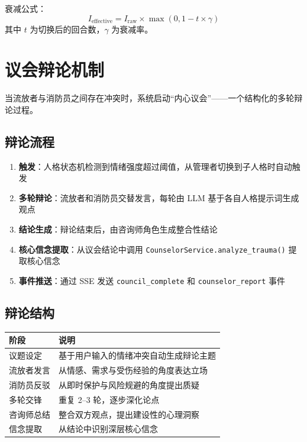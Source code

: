 \documentclass[12pt,a4paper]{ctexart}
\begin{document}
衰减公式：
\[
I_{\text{effective}} = I_{\text{raw}} \times \max(0, 1 - t \times \gamma)
\]
其中 $t$ 为切换后的回合数，$\gamma$ 为衰减率。

\section{议会辩论机制}

当流放者与消防员之间存在冲突时，系统启动``内心议会''——一个结构化的多轮辩论过程。

\subsection{辩论流程}

\begin{enumerate}[leftmargin=2em]
    \item \textbf{触发}：人格状态机检测到情绪强度超过阈值，从管理者切换到子人格时自动触发
    \item \textbf{多轮辩论}：流放者和消防员交替发言，每轮由 LLM 基于各自人格提示词生成观点
    \item \textbf{结论生成}：辩论结束后，由咨询师角色生成整合性结论
    \item \textbf{核心信念提取}：从议会结论中调用 \texttt{CounselorService.analyze\_trauma()} 提取核心信念
    \item \textbf{事件推送}：通过 SSE 发送 \texttt{council\_complete} 和 \texttt{counselor\_report} 事件
\end{enumerate}

\subsection{辩论结构}

\begin{table}[htbp]
\centering
\begin{tabular}{@{}lp{10cm}@{}}
\toprule
\textbf{阶段} & \textbf{说明} \\
\midrule
议题设定 & 基于用户输入的情绪冲突自动生成辩论主题 \\
流放者发言 & 从情感、需求与受伤经验的角度表达立场 \\
消防员反驳 & 从即时保护与风险规避的角度提出质疑 \\
多轮交锋 & 重复 2--3 轮，逐步深化论点 \\
咨询师总结 & 整合双方观点，提出建设性的心理洞察 \\
信念提取 & 从结论中识别深层核心信念 \\
\bottomrule
\end{tabular}
\end{table}
\end{document}

